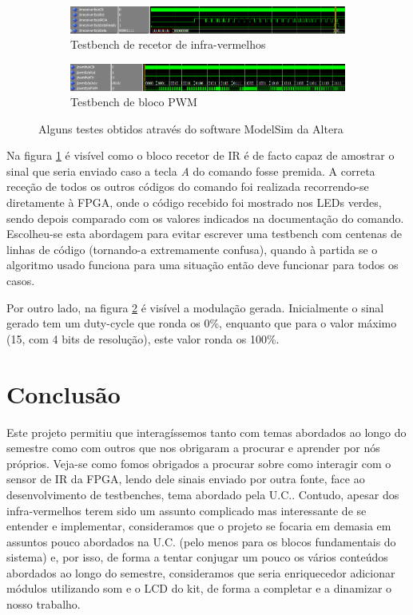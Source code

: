 \documentclass[a4paper,11pt,openright,oneside]{report}
\begin{document}
\begin{figure}
        \centering
        \begin{subfigure}[b]{1\textwidth}
                \includegraphics[width=\textwidth]{img/ir_leds2}
                \caption{Testbench de recetor de infra-vermelhos}
                \label{fig:ir_leds2}
        \end{subfigure}

        \begin{subfigure}[b]{1\textwidth}
                \includegraphics[width=\textwidth]{img/ir_leds3}
                \caption{Testbench de bloco PWM}
                \label{fig:ir_leds3}
        \end{subfigure}
        \caption{Alguns testes obtidos através do software ModelSim da Altera}\label{fig:testbenches}
\end{figure}

Na figura \ref{fig:ir_leds2} é visível como o bloco recetor de IR é de facto capaz de amostrar o sinal que seria enviado caso a tecla \textit{A} do comando fosse premida. A correta receção de todos os outros códigos do comando foi realizada recorrendo-se diretamente à FPGA, onde o código recebido foi mostrado nos LEDs verdes, sendo depois comparado com os valores indicados na documentação do comando. Escolheu-se esta abordagem para evitar escrever uma testbench com centenas de linhas de código (tornando-a extremamente confusa), quando à partida se o algoritmo usado funciona para uma situação então deve funcionar para todos os casos.

Por outro lado, na figura \ref{fig:ir_leds3} é visível a modulação gerada. Inicialmente o sinal gerado tem um duty-cycle que ronda os 0\%, enquanto que para o valor máximo (15, com 4 bits de resolução), este valor ronda os 100\%.

\section{Conclusão}
\label{sec:conclusão}

Este projeto permitiu que interagíssemos tanto com temas abordados ao longo do semestre como com outros que nos obrigaram a procurar e aprender por nós próprios. Veja-se como fomos obrigados a procurar sobre como interagir com o sensor de IR da FPGA, lendo dele sinais enviado por outra fonte, face ao desenvolvimento de testbenches, tema abordado pela U.C.. Contudo, apesar dos infra-vermelhos terem sido um assunto complicado mas interessante de se entender e implementar, consideramos que o projeto se focaria em demasia em assuntos pouco abordados na U.C. (pelo menos para os blocos fundamentais do sistema) e, por isso, de forma a tentar conjugar um pouco os vários conteúdos abordados ao longo do semestre, consideramos que seria enriquecedor adicionar módulos utilizando som e o LCD do kit, de forma a completar e a dinamizar o nosso trabalho.
\end{document}
